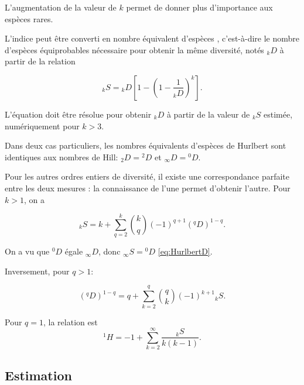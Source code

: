 \documentclass[
  11pt,
  american,
  a4paper,
  extrafontsizes,onecolumn,openright
  ]{memoir}
\newlength{\rf}
\begin{document}
L'augmentation de la valeur de \(k\) permet de donner plus d'importance aux espèces rares.

L'indice peut être converti en nombre équivalent d'espèces \autocite{Dauby2012}, c'est-à-dire le nombre d'espèces équiprobables nécessaire pour obtenir la même diversité, notés \(_{k}D\) à partir de la relation

\begin{equation}
  \label{eq:HurlbertD}
  _{k}S = {_{k}D} \left[ 1 - {\left( 1 - \frac{1}{_{k}D} \right)}^k \right].
\end{equation}

L'équation doit être résolue pour obtenir \(_{k}D\) à partir de la valeur de \(_{k}S\) estimée, numériquement pour \(k>3\).

Dans deux cas particuliers, les nombres équivalents d'espèces de Hurlbert sont identiques aux nombres de Hill: \(_{2}D = {^{2}\!D}\) et \(_{\infty}D = {^{0}\!D}\).

Pour les autres ordres entiers de diversité, il existe une correspondance parfaite entre les deux mesures \autocite[Annexe S2]{Chao2014}: la connaissance de l'une permet d'obtenir l'autre. Pour \(k>1\), on a \autocite{Leinster2012}

\begin{equation}
  \label{eq:HurlbertDq}
  _{k}S = k + \sum_{q=2}^{k}{\binom{k}{q} \left( -1 \right)^{q + 1} \left( ^{q}\!D \right)^{1-q}}.
\end{equation}

On a vu que \(^{0}\!D\) égale \(_{\infty}D\), donc \(_{\infty}S = {^{0}\!D}\) \eqref{eq:HurlbertD}.

Inversement, pour \(q > 1\):

\begin{equation}
  \label{eq:DqHurlbert}
  (^{q}\!D)^{1-q} = q + \sum_{k=2}^{q}{\binom{q}{k} \left( -1 \right)^{k + 1} {_{k}S}}.
\end{equation}

Pour \(q=1\), la relation est \autocite{Mao2007}
\begin{equation}
  \label{eq:Mao2007}
  ^{1}\!H = -1 + \sum_{k=2}^{\infty}{\frac{_{k}S}{k \left( k - 1 \right)}}.
\end{equation}

\hypertarget{estimation-1}{%
\subsection{Estimation}\label{estimation-1}}
\end{document}
